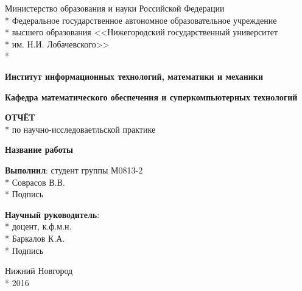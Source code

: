\begin{titlepage}

\begin{center}
Министерство образования и науки Российской Федерации \\*
Федеральное   государственное  автономное  образовательное  учреждение \\*
высшего образования <<Нижегородский государственный университет \\*
им. Н.И. Лобачевского>> \\*
\end{center}

\vspace{12pt}

\begin{center}
\textbf{Институт информационных технологий, математики и механики}
\end{center}

\begin{center}
\textbf{Кафедра математического обеспечения и суперкомпьютерных технологий}
\end{center}

\vspace{105pt}

\begin{center}
\fontsize{18pt}{0pt}\textbf{ОТЧЁТ} \\*
по научно-исследоваетльской практике
\end{center}

\begin{center}
\fontsize{16pt}{0pt}\textbf{Название работы}
\end{center}

\vspace{53pt}

\begin{flushright}
\textbf{Выполнил}: студент группы М0813-2 \\*
 Соврасов В.В. \\*
Подпись 
\end{flushright}

\begin{flushright}
\textbf{Научный руководитель}:  \\*
доцент, к.ф.м.н.  \\*
 Баркалов К.А. \\*
Подпись 
\end{flushright}

\vspace{\fill}

\begin{center}
Нижний Новгород \\*
2016
\end{center}

\end{titlepage}
